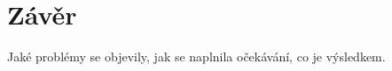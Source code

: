\chapter{Závěr}
\label{5-zaver}

Jaké problémy se objevily, jak se naplnila očekávání, co je výsledkem.
